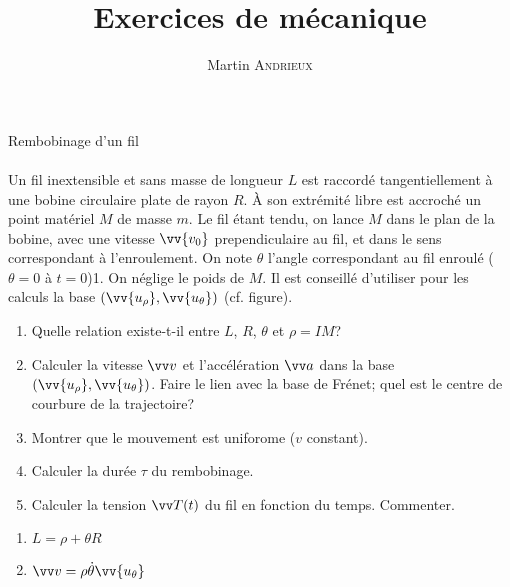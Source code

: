\documentclass[french, a4paper, 11pt]{article}
\title{Exercices de mécanique}
\author{Martin \textsc{Andrieux}}
\date{}
\newcommand{\po}{\left(}         %
\newcommand{\pf}{\right)}        %
\newcommand{\pof}[1]{\po #1 \pf} %
\newcommand{\vect}[1]{\vv{#1}}
\newcommand{\uth}{\vect{u_\theta}}    %
\newcommand{\urho}{\vv{u_\rho}}       %
\begin{document}
\maketitle

\begin{cadre}{Rembobinage d'un fil}
  \paragraph*{}
  \begin{minipage}{0.6\linewidth}
    Un fil inextensible et sans masse de longueur $L$ est raccordé tangentiellement à une bobine circulaire plate de rayon $R$.
    À son extrémité libre est accroché un point matériel $M$ de masse $m$. Le fil étant tendu, on lance $M$ dans le plan de la bobine, avec une vitesse $\vv{v_{0}}$ prependiculaire au fil, et dans le sens correspondant à l'enroulement.
    On note $\theta$ l'angle correspondant au fil enroulé ($\theta = 0$ à $t=0$)1. On néglige le poids de $M$. Il est conseillé d'utiliser pour les calculs la base $\pof{\urho, \uth}$ (cf. figure).
    \begin{enumerate}[label=\upshape\alph*)]
      \item Quelle relation existe-t-il entre $L$, $R$, $\theta$ et $\rho = IM$?
      \item Calculer la vitesse $\vv v$ et l'accélération $\vv a$ dans la base $\pof{\urho, \uth}$. Faire le lien avec la base de Frénet; quel est le centre de courbure de la trajectoire?
      \item Montrer que le mouvement est uniforome ($v$ constant).
      \item Calculer la durée $\tau$ du rembobinage.
      \item Calculer la tension $\vv T(t)$ du fil en fonction du temps. Commenter.
    \end{enumerate}
  \end{minipage}
  \begin{minipage}{0.35\linewidth}
  \end{minipage}
  \tcblower
  \begin{multicols}{2}
    \begin{enumerate}[label=\upshape\alph*)]
      \item $L = \rho + \theta R$
      \item $\vv v = \rho\dot\theta\uth$


\end{enumerate}
\end{multicols}
\end{cadre}
\end{document}
